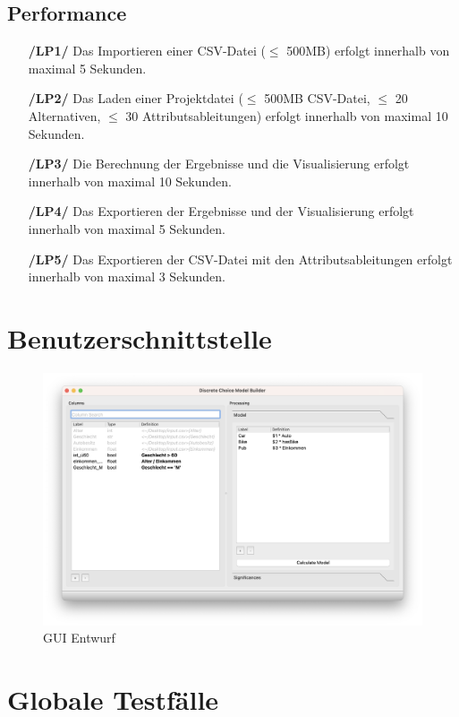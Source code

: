 \documentclass{article}
\begin{document}
\subsection{Performance}
\begin{itemize}
    \item[\textbf{/LP1/}] Das Importieren einer CSV-Datei ($\leq$ 500MB) erfolgt innerhalb von maximal 5 Sekunden.
    \item[\textbf{/LP2/}] Das Laden einer Projektdatei ($\leq$ 500MB CSV-Datei, $\leq$ 20 Alternativen, $\leq$ 30 Attributsableitungen) erfolgt innerhalb von maximal 10 Sekunden.
    \item[\textbf{/LP3/}] Die Berechnung der Ergebnisse und die Visualisierung erfolgt innerhalb von maximal 10 Sekunden.
    \item[\textbf{/LP4/}] Das Exportieren der Ergebnisse und der Visualisierung erfolgt innerhalb von maximal 5 Sekunden.
    \item[\textbf{/LP5/}] Das Exportieren der CSV-Datei mit den Attributsableitungen erfolgt innerhalb von maximal 3 Sekunden.
\end{itemize}

\clearpage
\section{Benutzerschnittstelle}
\begin{figure}[H]%
  \centering
  \includegraphics[width=12cm]{img/gui-screenshots/columns+model.png}
  \caption{GUI Entwurf}
\end{figure}

\clearpage
\section{Globale Testfälle}
\end{document}
